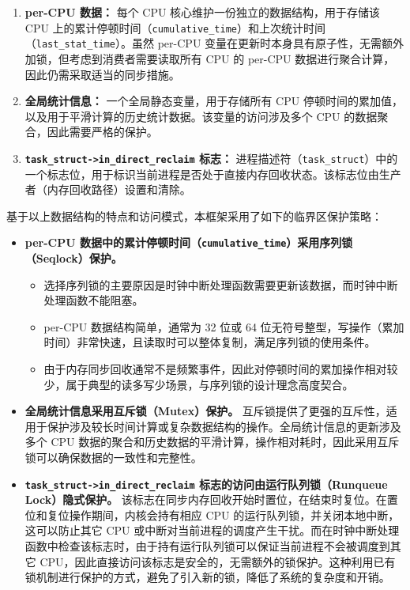 \begin{enumerate}
    \item \textbf{per-CPU 数据：} 每个 CPU 核心维护一份独立的数据结构，用于存储该 CPU 上的累计停顿时间（\texttt{cumulative\_time}）和上次统计时间（\texttt{last\_stat\_time}）。虽然 per-CPU 变量在更新时本身具有原子性，无需额外加锁，但考虑到消费者需要读取所有 CPU 的 per-CPU 数据进行聚合计算，因此仍需采取适当的同步措施。

    \item \textbf{全局统计信息：} 一个全局静态变量，用于存储所有 CPU 停顿时间的累加值，以及用于平滑计算的历史统计数据。该变量的访问涉及多个 CPU 的数据聚合，因此需要严格的保护。

    \item \textbf{\texttt{task\_struct->in\_direct\_reclaim} 标志：} 进程描述符（\texttt{task\_struct}）中的一个标志位，用于标识当前进程是否处于直接内存回收状态。该标志位由生产者（内存回收路径）设置和清除。
\end{enumerate}

基于以上数据结构的特点和访问模式，本框架采用了如下的临界区保护策略：

\begin{itemize}
    \item \textbf{per-CPU 数据中的累计停顿时间（\texttt{cumulative\_time}）采用序列锁（Seqlock）保护。}
    \begin{itemize}
        \item 选择序列锁的主要原因是时钟中断处理函数需要更新该数据，而时钟中断处理函数不能阻塞。
        \item per-CPU 数据结构简单，通常为 32 位或 64 位无符号整型，写操作（累加时间）非常快速，且读取时可以整体复制，满足序列锁的使用条件。
        \item 由于内存同步回收通常不是频繁事件，因此对停顿时间的累加操作相对较少，属于典型的读多写少场景，与序列锁的设计理念高度契合。
    \end{itemize}

    \item \textbf{全局统计信息采用互斥锁（Mutex）保护。} 互斥锁提供了更强的互斥性，适用于保护涉及较长时间计算或复杂数据结构的操作。全局统计信息的更新涉及多个 CPU 数据的聚合和历史数据的平滑计算，操作相对耗时，因此采用互斥锁可以确保数据的一致性和完整性。

    \item \textbf{\texttt{task\_struct->in\_direct\_reclaim} 标志的访问由运行队列锁（Runqueue Lock）隐式保护。}
    该标志在同步内存回收开始时置位，在结束时复位。在置位和复位操作期间，内核会持有相应 CPU 的运行队列锁，并关闭本地中断，这可以防止其它 CPU 或中断对当前进程的调度产生干扰。而在时钟中断处理函数中检查该标志时，由于持有运行队列锁可以保证当前进程不会被调度到其它 CPU，因此直接访问该标志是安全的，无需额外的锁保护。这种利用已有锁机制进行保护的方式，避免了引入新的锁，降低了系统的复杂度和开销。
\end{itemize}

